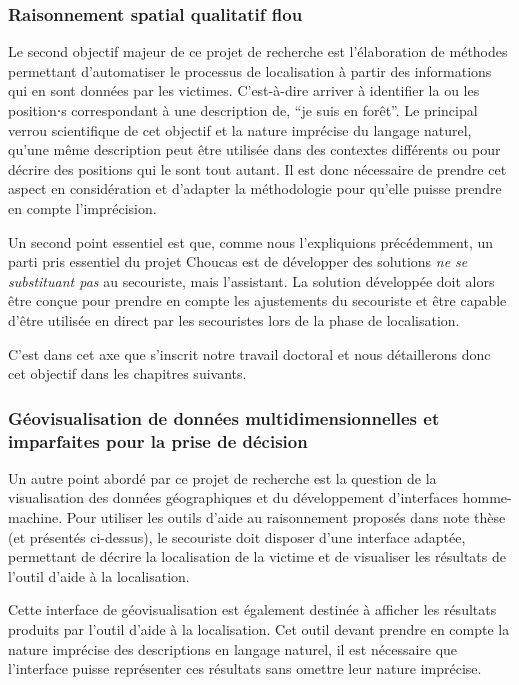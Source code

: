 \subsubsection{Raisonnement spatial qualitatif flou}

Le second objectif majeur de ce projet de recherche est l’élaboration
de méthodes permettant d'automatiser le processus de localisation à
partir des informations qui en sont données par les
victimes. C'est-à-dire arriver à identifier la ou les position⋅s
correspondant à une description de, \eg \enquote{je suis en forêt}. Le
principal verrou scientifique de cet objectif et la nature imprécise
du langage naturel, \ie qu'une même description peut être utilisée
dans des contextes différents ou pour décrire des positions qui le
sont tout autant. Il est donc nécessaire de prendre cet aspect en
considération et d'adapter la méthodologie pour qu'elle puisse prendre
en compte l'imprécision.

Un second point essentiel est que, comme nous l'expliquions
précédemment, un parti pris essentiel du projet Choucas est de
développer des solutions \emph{ne se substituant pas} au secouriste,
mais l’assistant. La solution développée doit alors être conçue pour
prendre en compte les ajustements du secouriste et être capable d'être
utilisée en direct par les secouristes lors de la phase de
localisation.

C'est dans cet axe que s'inscrit notre travail doctoral et nous
détaillerons donc cet objectif dans les chapitres suivants.

\subsubsection{Géovisualisation de données multidimensionnelles et
  imparfaites pour la prise de décision}

Un autre point abordé par ce projet de recherche est la question de la
visualisation des données géographiques et du développement
d'interfaces homme-machine. Pour utiliser les outils d'aide au
raisonnement proposés dans note thèse (et présentés ci-dessus), le
secouriste doit disposer d'une interface adaptée, permettant de
décrire la localisation de la victime et de visualiser les résultats
de l'outil d'aide à la localisation. 

Cette interface de géovisualisation est également destinée à afficher
les résultats produits par l'outil d'aide à la localisation. Cet outil
devant prendre en compte la nature imprécise des descriptions en
langage naturel, il est nécessaire que l'interface puisse représenter
ces résultats sans omettre leur nature imprécise.  

